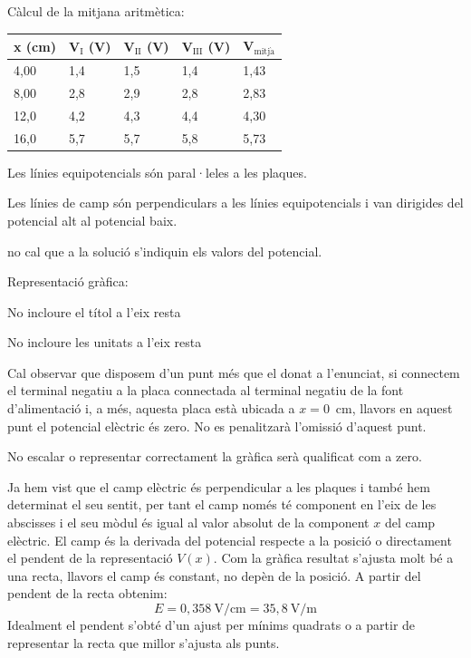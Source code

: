 \begin{solapartat}
 Càlcul de la mitjana aritmètica:

\begin{center}
\begin{tabular}{lllll}
\toprule
\textbf{x (cm)} & $\mathbf{V_\mathrm{I}}$ \textbf{(V)} & $\mathbf{V_\mathrm{II}}$ \textbf{(V)} & $\mathbf{V_\mathrm{III}}$ \textbf{(V)} & $\mathbf{V_\mathrm{mitj\grave{a}}}$ \\
\midrule
4,00 & 1,4 & 1,5 & 1,4 & 1,43 \\
8,00 & 2,8 & 2,9 & 2,8 & 2,83 \\
12,0 & 4,2 & 4,3 & 4,4 & 4,30 \\
16,0 & 5,7 & 5,7 & 5,8 & 5,73 \\
\bottomrule
\end{tabular}
\end{center}

 Les línies equipotencials són paral·leles a les plaques.

 Les línies de camp són perpendiculars a les línies equipotencials i van dirigides del potencial alt al potencial baix.


 no cal que a la solució s'indiquin els valors del potencial.

 Representació gràfica:


No incloure el títol a l'eix resta 

No incloure les unitats a l'eix resta 

Cal observar que disposem d'un punt més que el donat a l'enunciat, si connectem el terminal negatiu a la placa connectada al terminal negatiu de la font d'alimentació i, a més, aquesta placa està ubicada a $x = 0$~cm, llavors en aquest punt el potencial elèctric és zero. No es penalitzarà l'omissió d'aquest punt.

No escalar o representar correctament la gràfica serà qualificat com a zero.

 Ja hem vist que el camp elèctric és perpendicular a les plaques i també hem determinat el seu sentit, per tant el camp només té component en l'eix de les abscisses i el seu mòdul és igual al valor absolut de la component $x$ del camp elèctric. El camp és la derivada del potencial respecte a la posició o directament el pendent de la representació $V(x)$. Com la gràfica resultat s'ajusta molt bé a una recta, llavors el camp és constant, no depèn de la posició. A partir del pendent de la recta obtenim:
\[ E = 0,358\ \mathrm{V/cm} = 35,8\ \mathrm{V/m} \]
Idealment el pendent s'obté d'un ajust per mínims quadrats o a partir de representar la recta que millor s'ajusta als punts.


\end{solapartat}

